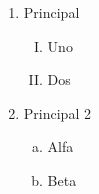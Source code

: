 
\begin{enumerate}
\item Principal
\begin{enumerate}[I.]
\item Uno
\item Dos
\end{enumerate}
\item Principal 2
\begin{enumerate}[a)]
\item Alfa
\item Beta
\end{enumerate}
\end{enumerate}
